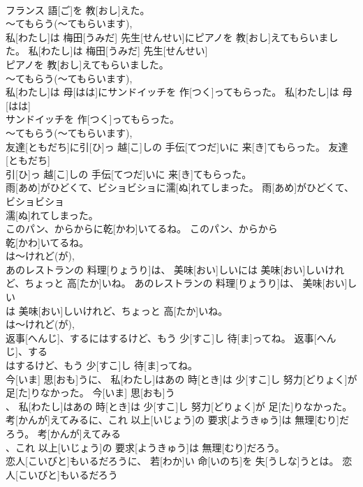 \documentclass[8pt]{extreport}
\begin{document}
\begin{CJK}{UTF8}{min}
\\	フランス 語[ご]を 教[おし]えた。	
\\	～てもらう(～てもらいます), 
\\	私[わたし]は 梅田[うみだ] 先生[せんせい]にピアノを 教[おし]えてもらいました。	私[わたし]は 梅田[うみだ] 先生[せんせい]
\\	ピアノを 教[おし]えてもらいました。	
\\	～てもらう(～てもらいます), 
\\	私[わたし]は 母[はは]にサンドイッチを 作[つく]ってもらった。	私[わたし]は 母[はは]
\\	サンドイッチを 作[つく]ってもらった。	
\\	～てもらう(～てもらいます), 
\\	友達[ともだち]に引[ひ]っ 越[こ]しの 手伝[てつだ]いに 来[き]てもらった。	友達[ともだち]
\\	引[ひ]っ 越[こ]しの 手伝[てつだ]いに 来[き]てもらった。	
\\	雨[あめ]がひどくて、ビショビショに濡[ぬ]れてしまった。	雨[あめ]がひどくて、ビショビショ
\\	濡[ぬ]れてしまった。	
\\	このパン、からからに乾[かわ]いてるね。	このパン、からから
\\	乾[かわ]いてるね。	
\\	は～けれど(が), 
\\	あのレストランの 料理[りょうり]は、 美味[おい]しいには 美味[おい]しいけれど、ちょっと 高[たか]いね。	あのレストランの 料理[りょうり]は、 美味[おい]しい
\\	は 美味[おい]しいけれど、ちょっと 高[たか]いね。	
\\	は～けれど(が), 
\\	返事[へんじ]、するにはするけど、もう 少[すこ]し 待[ま]ってね。	返事[へんじ]、する
\\	はするけど、もう 少[すこ]し 待[ま]ってね。	
\\	今[いま] 思[おも]うに、 私[わたし]はあの 時[とき]は 少[すこ]し 努力[どりょく]が 足[た]りなかった。	今[いま] 思[おも]う
\\	、 私[わたし]はあの 時[とき]は 少[すこ]し 努力[どりょく]が 足[た]りなかった。	
\\	考[かんが]えてみるに、これ 以上[いじょう]の 要求[ようきゅう]は 無理[むり]だろう。	考[かんが]えてみる
\\	、これ 以上[いじょう]の 要求[ようきゅう]は 無理[むり]だろう。	
\\	恋人[こいびと]もいるだろうに、 若[わか]い 命[いのち]を 失[うしな]うとは。	恋人[こいびと]もいるだろう

\end{CJK}
\end{document}

